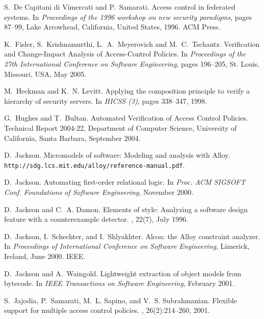 \documentclass{acm_proc_article-sp}
\begin{document}
\begin{thebibliography}{10}
S.~{De Capitani di Vimercati} and P.~Samarati.
\newblock Access control in federated systems.
\newblock In {\em Proceedings of the 1996 workshop on new security paradigms},
  pages 87--99, Lake Arrowhead, California, United States, 1996. ACM Press.

K.~Fisler, S.~Krishnamurthi, L.~A.~Meyerovich and M.~C.~Tschantz.
\newblock Verification and Change-Impact Analysis of Access-Control Policies.
\newblock In {\em Proceedings of the 27th International Conference on Software Engineering}, 
pages 196--205, St. Louis, Missouri, USA, May 2005.

M.~Heckman and K.~N. Levitt.
\newblock Applying the composition principle to verify a hierarchy of security
  servers.
\newblock In {\em {HICSS} (3)}, pages 338--347, 1998.

G.~Hughes and T.~Bultan.
\newblock Automated Verification of Access Control Policies.
\newblock Technical Report 2004-22, Department of Computer Science, 
University of California, Santa Barbara, September 2004.

D.~Jackson.
\newblock Micromodels of software: Modeling and analysis with {A}lloy.
\newblock \texttt{http://sdg.lcs.mit.edu/alloy/reference-manual.pdf}.

D.~Jackson.
\newblock Automating first-order relational logic.
\newblock In {\em Proc. ACM SIGSOFT Conf. Foundations of Software Engineering},
  November 2000.

D.~Jackson and C.~A. Damon.
\newblock Elements of style: Analyzing a software design feature with a
  counterexample detector.
, 22(7), July 1996.

D.~Jackson, I.~Schechter, and I.~Shlyakhter.
\newblock Alcoa: the {A}lloy constraint analyzer.
\newblock In {\em Proceedings of International Conference on Software
  Engineering}, Limerick, Ireland, June 2000. IEEE.

D.~Jackson and A.~Waingold.
\newblock Lightweight extraction of object models from bytecode.
\newblock In {\em IEEE Transactions on Software Engineering}, February 2001.

S.~Jajodia, P.~Samarati, M.~L. Sapino, and V.~S. Subrahmanian.
\newblock Flexible support for multiple access control policies.
, 26(2):214--260, 2001.


\end{thebibliography}
\end{document}
